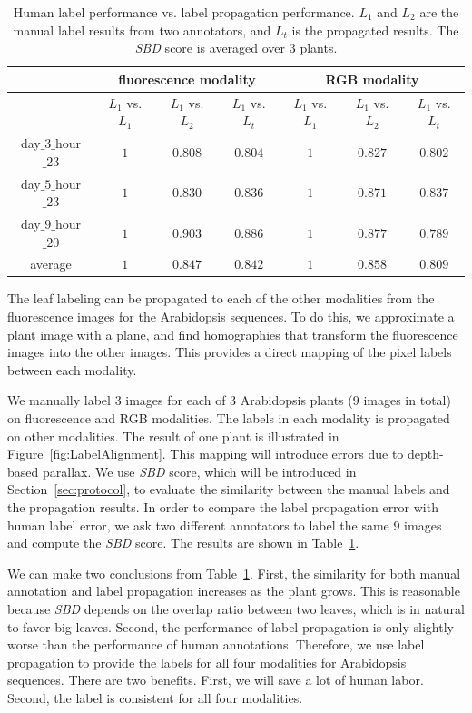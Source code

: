 \begin{table}[t]
\centering
\caption{Human label performance vs. label propagation performance.
$L_1$ and $L_2$ are the manual label results from two annotators, and $L_t$ is the propagated results.
The {\it{SBD}} score is averaged over $3$ plants.}
\begin{tabular}{c|c|c|c|c|c|c}
\hline
    & \multicolumn{3}{c|}{fluorescence modality} & \multicolumn{3}{c}{RGB modality}\\ \hline
    & $L_1$ vs. $L_1$ & $L_1$ vs. $L_2$  & $L_1$ vs. $L_t$ & $L_1$ vs. $L_1$ & $L_1$ vs. $L_2$ & $L_1$ vs. $L_t$ \\ \hline
   day$\_3\_$hour$\_23$ & $1$ & $0.808$ & $0.804$ & $1$ & $0.827$ & $0.802$ \\ \hline
   day$\_5\_$hour$\_23$ & $1$ & $0.830$ & $0.836$ & $1$ & $0.871$ & $0.837$ \\ \hline
   day$\_9\_$hour$\_20$ & $1$ & $0.903$ & $0.886$ & $1$ & $0.877$ & $0.789$ \\ \hline
                   average &          $1$ & $0.847$ & $0.842$ & $1$ & $0.858$ & $0.809$ \\ \hline
\end{tabular}
\label{tab:labelError}
\end{table}

The leaf labeling can be propagated to each of the other modalities from the fluorescence images for the Arabidopsis sequences.  
To do this, we approximate a plant image with a plane, and find homographies that transform the fluorescence images into the other images.  
This provides a direct mapping of the pixel labels between each modality.

We manually label $3$ images for each of $3$ Arabidopsis plants ($9$ images in total) on fluorescence and RGB modalities. 
The labels in each modality is propagated on other modalities. 
The result of one plant is illustrated in Figure~\ref{fig:LabelAlignment}.
This mapping will introduce errors due to depth-based parallax.  
We use {\it{SBD}} score, which will be introduced in Section~\ref{sec:protocol}, to evaluate the similarity between the manual labels and the propagation results. 
In order to compare the label propagation error with human label error, we ask two different annotators to label the same $9$ images and compute the {\it{SBD}} score. 
The results are shown in Table~\ref{tab:labelError}.

We can make two conclusions from Table~\ref{tab:labelError}.
First, the similarity for both manual annotation and label propagation increases as the plant grows.
This is reasonable because {\it{SBD}} depends on the overlap ratio between two leaves, which is in natural to favor big leaves. 
Second, the performance of label propagation is only slightly worse than the performance of human annotations. 
Therefore, we use label propagation to provide the labels for all four modalities for Arabidopsis sequences. 
There are two benefits. 
First, we will save a lot of human labor. 
Second, the label is consistent for all four modalities. 


